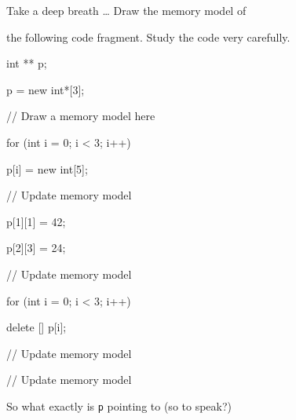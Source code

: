 Take a deep breath \ldots{} Draw the memory model of

the following code fragment. Study the code very carefully.



\begin{consolethree}[escapeinside=||]

int ** p;

p = new int*[3];

// Draw a memory model here

for (int i = 0; i < 3; i++)

{

    p[i] = new int[5];

    // Update memory model

}

p[1][1] = 42;

p[2][3] = 24;

// Update memory model

for (int i = 0; i < 3; i++)

{

    delete [] p[i];

    // Update memory model

}

// Update memory model

\end{consolethree}



So what exactly is \texttt{p} pointing to (so to speak?)

